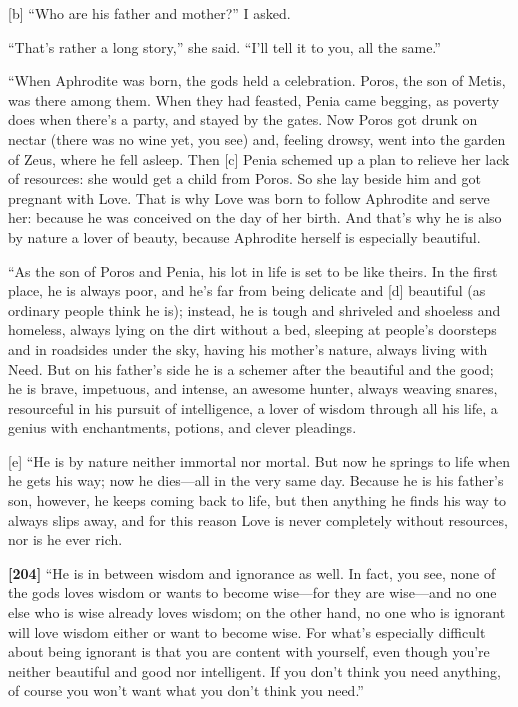 {[}b{]} “Who are his father and mother?” I asked.

“That's rather a long story,” she said. “I'll tell it to you, all the
same.”

“When Aphrodite was born, the gods held a celebration. Poros, the son of
Metis, was there among
them. When they had
feasted, Penia came begging, as poverty does when there's a party, and
stayed by the gates. Now Poros got drunk on nectar (there was no wine
yet, you see) and, feeling drowsy, went into the garden of Zeus, where
he fell asleep. Then {[}c{]} Penia schemed up a plan to relieve her lack
of resources: she would get a child from Poros. So she lay beside him
and got pregnant with Love. That is why Love was born to follow
Aphrodite and serve her: because he was conceived on the day of her
birth. And that's why he is also by nature a lover of beauty, because
Aphrodite herself is especially beautiful.

“As the son of Poros and Penia, his lot in life is set to be like
theirs. In the first place, he is always poor, and he's far from being
delicate and {[}d{]} beautiful (as ordinary people think he is);
instead, he is tough and shriveled and shoeless and homeless, always
lying on the dirt without a bed, sleeping at people's doorsteps and in
roadsides under the sky, having his mother's nature, always living with
Need. But on his father's side he is a schemer after the beautiful and
the good; he is brave, impetuous, and intense, an awesome hunter, always
weaving snares, resourceful in his pursuit of intelligence, a lover of
wisdom through all
his life, a genius with enchantments, potions, and clever pleadings.

{[}e{]} “He is by nature neither immortal nor mortal. But now he springs
to life when he gets his way; now he dies---all in the very same day.
Because he is his father's son, however, he keeps coming back to life,
but then anything he finds his way to always slips away, and for this
reason Love is never completely without resources, nor is he ever rich.

{\bf {[}204{]}} “He is in between wisdom and ignorance as well. In fact,
you see, none of the gods loves wisdom or wants to become wise---for
they are wise---and no one else who is wise already loves wisdom; on the
other hand, no one who is ignorant will love wisdom either or want to
become wise. For what's especially difficult about being ignorant is
that you are content with yourself, even though you're neither beautiful
and good nor intelligent. If you don't think you need anything, of
course you won't want what you don't think you need.”

